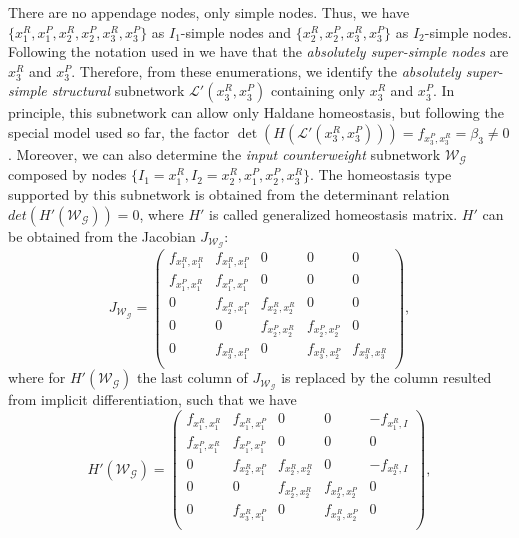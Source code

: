 There are no appendage nodes, only simple nodes. Thus, we have 
$\{ x_1^R, x_1^P, x_2^R, x_2^P, x_3^R, x_3^P \}$ as $I_1$-simple 
nodes and $\{ x_2^R, x_2^P, x_3^R, x_3^P \}$ as $I_2$-simple 
nodes. Following the notation used in \cite{multi_input_antoneli2020}
we have that the \textit{absolutely super-simple nodes} are $x_3^R$ and 
$x_3^P$. Therefore, from these enumerations, we identify the 
\textit{absolutely super-simple structural} subnetwork 
$\mathcal{L'}(x_3^R, x_3^P)$ containing only $x_3^R$ and 
$x_3^P$. In principle, this subnetwork can allow only Haldane 
homeostasis, but following the special model used so far, the
factor $\det(H(\mathcal{L'}(x_3^R, x_3^P))) = f_{x_3^P,x_3^R} 
= \beta_3 \neq 0$. 
Moreover, we can also determine the \textit{input 
counterweight} subnetwork $\mathcal{W}_{\mathcal{G}}$ composed 
by nodes $\{ I_1 = x_1^R, I_2 = x_2^R, x_1^P, x_2^P, x_3^R \}$. 
The homeostasis type supported by this subnetwork is obtained 
from the determinant relation 
$det(H'(\mathcal{W}_{\mathcal{G}})) = 0$, where $H'$ is called
generalized homeostasis matrix. $H'$ can be obtained from the 
Jacobian $J_{\mathcal{W}_{\mathcal{G}}}$:
\begin{equation}
    J_{\mathcal{W}_{\mathcal{G}}} = 
    \begin{pmatrix}
        f_{x_1^R, x_1^R} & f_{x_1^R,x_1^P} & 0 & 0 & 0 \\
        f_{x_1^P, x_1^R} & f_{x_1^P, x_1^P} & 0 & 0 & 0 \\
        0 & f_{x_2^R, x_1^P} & f_{x_2^R, x_2^R} & 0 & 0 \\
        0 & 0 & f_{x_2^P, x_2^R} & f_{x_2^P, x_2^P} & 0 \\
        0 & f_{x_3^R, x_1^P} & 0 & f_{x_3^R, x_2^P} & f_{x_3^R, x_3^R} \\
    \end{pmatrix},
\end{equation} 
where for $H'(\mathcal{W}_{\mathcal{G}})$ the last column of 
$J_{\mathcal{W}_{\mathcal{G}}}$ is replaced by the column 
resulted from implicit differentiation, such that we have
\begin{equation}
    H'({\mathcal{W}_{\mathcal{G}}}) = 
    \begin{pmatrix}
        f_{x_1^R, x_1^R} & f_{x_1^R,x_1^P} & 0 & 0 & -f_{x_1^R, I} \\
        f_{x_1^P, x_1^R} & f_{x_1^P, x_1^P} & 0 & 0 & 0 \\
        0 & f_{x_2^R, x_1^P} & f_{x_2^R, x_2^R} & 0 & -f_{x_2^R, I} \\
        0 & 0 & f_{x_2^P, x_2^R} & f_{x_2^P, x_2^P} & 0 \\
        0 & f_{x_3^R, x_1^P} & 0 & f_{x_3^R, x_2^P} & 0 \\
    \end{pmatrix},
\end{equation} 
